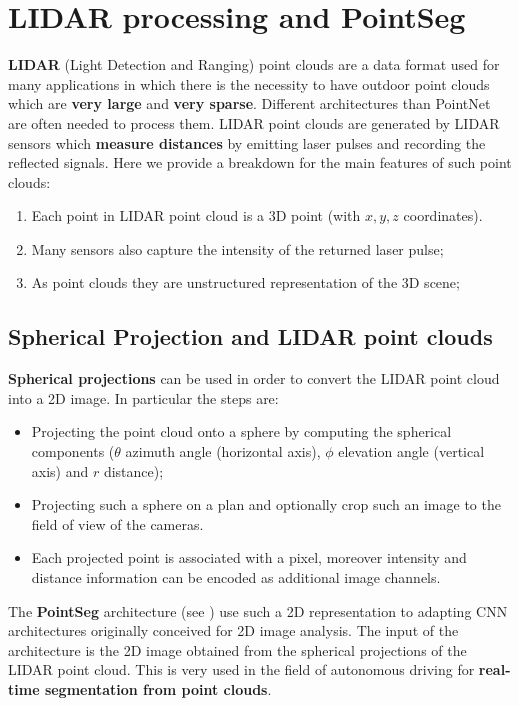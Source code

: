 \section{LIDAR processing and PointSeg}
\textbf{LIDAR} (Light Detection and Ranging) point clouds are a data format used for many applications in which there is the necessity to have outdoor point clouds which are \textbf{very large} and \textbf{very sparse}. Different architectures than PointNet are often needed to process them. LIDAR point clouds are generated by LIDAR sensors which \textbf{measure distances} by emitting laser pulses and recording the reflected signals. Here we provide a breakdown for the main features of such point clouds: 
\begin{enumerate}
    \itemsep-0.3em
    \item Each point in LIDAR point cloud is a 3D point (with $x,y,z$ coordinates).
    \item Many sensors also capture the intensity of the returned laser pulse;
    \item As point clouds they are unstructured representation of the 3D scene; 
\end{enumerate}

\subsection{Spherical Projection and LIDAR point clouds}
\textbf{Spherical projections} can be used in order to convert the LIDAR point cloud into a 2D image. In particular the steps are: 
\begin{itemize}
    \itemsep-0.3em
    \item Projecting the point cloud onto a sphere  by computing the spherical components ($\theta$ azimuth angle (horizontal axis), $\phi$ elevation angle (vertical axis) and $r$ distance); 
    \item Projecting such a sphere on a plan and optionally crop such an image to the field of view of the cameras. 
    \item Each projected point is associated with a pixel, moreover intensity and distance information can be encoded as additional image channels.
\end{itemize}

The \textbf{PointSeg} architecture (see  \cite{pointseg}) use such a 2D representation to adapting CNN architectures originally conceived for 2D image analysis. The input of the architecture is the 2D image obtained from the spherical projections of the LIDAR point cloud. This is very used in the field of autonomous driving for \textbf{real-time segmentation from point clouds}.

